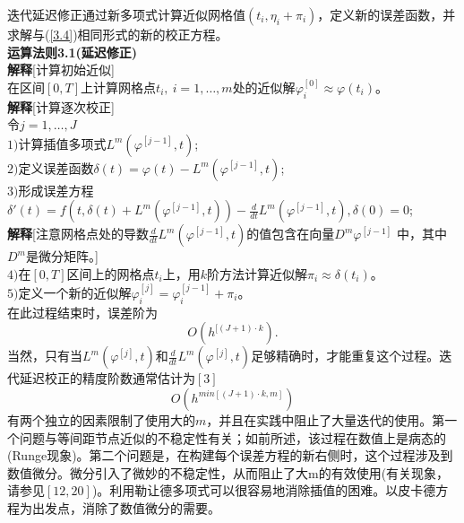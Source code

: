 \documentclass[12pt,a4paper]{article}
\begin{document}
迭代延迟修正通过新多项式计算近似网格值$(t_i,\eta_i+\pi_i)$，定义新的误差函数，并求解与(\ref{3.4})相同形式的新的校正方程。\\

\textbf{运算法则3.1(延迟修正)}\\

\textbf{解释}[计算初始近似]\\

在区间$[0,T]$上计算网格点$t_i,~i=1,\ldots,m$处的近似解$\varphi^{[0]}_i \approx \varphi(t_i)$。\\

\textbf{解释}[计算逐次校正]\\

令$j=1,\ldots,J$\\

$1)$计算插值多项式$L^m(\varphi^{[j-1]},t)$;\\

$2)$定义误差函数$\delta(t)=\varphi(t)-L^m(\varphi^{[j-1]},t)$;\\

$3)$形成误差方程$\delta'(t)=f(t,\delta(t)+L^m(\varphi^{[j-1]},t))-\frac{d}{dt}L^m(\varphi^{[j-1]},t),\delta(0)=0$;\\

\textbf{解释}[注意网格点处的导数$\frac{d}{dt}L^m(\varphi^{[j-1]},t)$的值包含在向量$D^m\varphi ^{[j-1]}$ 中，其中$D^m$是微分矩阵。]\\

$4)$在$[0,T]$区间上的网格点$t_i$上，用$k$阶方法计算近似解$\pi_i \approx \delta(t_i)$。\\

$5)$定义一个新的近似解$\varphi_{i}^{[j]}= \varphi_{i}^{[j-1]}+\pi _i$。\\

在此过程结束时，误差阶为\\
\begin{equation}
O(h^{[(J+1) \cdot k}).
\end{equation}
当然，只有当$L^m(\varphi^{[j]},t)$和$\frac{d}{dt}L^m(\varphi^{[j]},t)$足够精确时，才能重复这个过程。迭代延迟校正的精度阶数通常估计为$[3]$\\
\begin{equation}
O(h^{min[(J+1) \cdot k,m]})
\end{equation}
有两个独立的因素限制了使用大的$m$，并且在实践中阻止了大量迭代的使用。第一个问题与等间距节点近似的不稳定性有关；如前所述，该过程在数值上是病态的(Runge现象)。第二个问题是，在构建每个误差方程的新右侧时，这个过程涉及到数值微分。微分引入了微妙的不稳定性，从而阻止了大m的有效使用(有关现象，请参见$[12,20]$)。利用勒让德多项式可以很容易地消除插值的困难。以皮卡德方程为出发点，消除了数值微分的需要。\\
\end{document}
